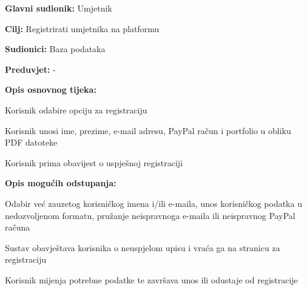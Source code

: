 					\noindent {}
					\begin{packed_item}
						
						\item \textbf{Glavni sudionik: } Umjetnik
						\item  \textbf{Cilj:}  Registrirati umjetnika na platformu
						\item  \textbf{Sudionici:}  Baza podataka
						\item  \textbf{Preduvjet:}  -
						\item  \textbf{Opis osnovnog tijeka:}
						
						\item[] \begin{packed_enum}
							
							\item  Korisnik odabire opciju za registraciju
							\item  Korisnik unosi ime, prezime, e-mail adresu, PayPal račun i 
							portfolio u obliku PDF datoteke
							\item  Korisnik prima obavijest o uspješnoj registraciji
						\end{packed_enum}
						
						\item  \textbf{Opis mogućih odstupanja:}
						
						\item[] \begin{packed_item}
							
							\item[2.a]  Odabir već zauzetog korisničkog imena i/ili e-maila, unos korisničkog 
							podatka u nedozvoljenom formatu, pružanje neispravnoga e-maila ili neispravnog PayPal računa
							\item[] \begin{packed_enum}
								
								\item  Sustav obavještava korisnika o neuspjelom upisu i 
								vraća ga na stranicu za registraciju
								\item  Korisnik mijenja potrebne podatke te završava unos ili 
								odustaje od registracije
								
							\end{packed_enum}
							
						\end{packed_item}
					\end{packed_item}
						
